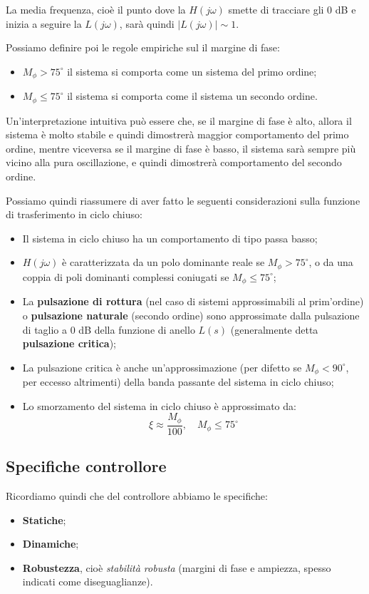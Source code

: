 \documentclass[a4paper,11pt]{article}
\begin{document}
\par\bigskip

La media frequenza, cioè il punto dove la $H(j\omega)$ smette di tracciare gli 0 dB e inizia a seguire la $L(j\omega)$, sarà quindi $|L(j\omega)| \sim 1$.

\par\smallskip

Possiamo definire poi le regole empiriche sul il margine di fase:
\begin{itemize}
	\item $M_\phi > 75^\circ$ il sistema si comporta come un sistema del primo ordine;
	\item $M_\phi \leq 75^\circ$ il sistema si comporta come il sistema un secondo ordine.
\end{itemize}

Un'interpretazione intuitiva può essere che, se il margine di fase è alto, allora il sistema è molto stabile e quindi dimostrerà maggior comportamento del primo ordine, mentre viceversa se il margine di fase è basso, il sistema sarà sempre più vicino alla pura oscillazione, e quindi dimostrerà comportamento del secondo ordine.

Possiamo quindi riassumere di aver fatto le seguenti considerazioni sulla funzione di trasferimento in ciclo chiuso:
\begin{itemize}
	\item Il sistema in ciclo chiuso ha un comportamento di tipo passa basso;
	\item $H(j\omega)$ è caratterizzata da un polo dominante reale se $M_\phi > 75^\circ$, o da una coppia di poli dominanti complessi coniugati se $M_\phi \leq 75^\circ$;
	\item La \textbf{pulsazione di rottura} (nel caso di sistemi approssimabili al prim'ordine) o \textbf{pulsazione naturale} (secondo ordine) sono approssimate dalla pulsazione di taglio a 0 dB della funzione di anello $L(s)$ (generalmente detta \textbf{pulsazione critica});
	\item La pulsazione critica è anche un'approssimazione (per difetto se $M_\phi < 90^\circ$, per eccesso altrimenti) della banda passante del sistema in ciclo chiuso;
	\item Lo smorzamento del sistema in ciclo chiuso è approssimato da:
		$$
		\xi \approx \frac{M_\phi}{100}, \quad M_\phi \leq 75^\circ
		$$
\end{itemize}

\subsection{Specifiche controllore}
Ricordiamo quindi che del controllore abbiamo le specifiche:
\begin{itemize}
	\item \textbf{Statiche};
	\item \textbf{Dinamiche};
	\item \textbf{Robustezza}, cioè \textit{stabilità robusta} (margini di fase e ampiezza, spesso indicati come diseguaglianze).
\end{itemize}
\end{document}
